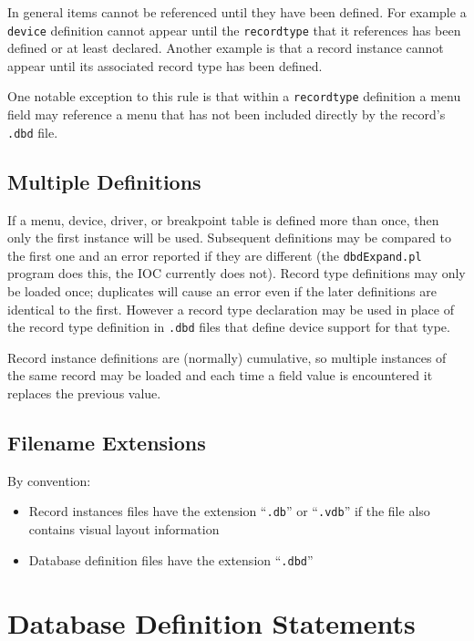 In general items cannot be referenced until they have been defined.
For example a \verb|device| definition cannot appear until the \verb|recordtype| that it references has been defined or at least declared.
Another example is that a record instance cannot appear until its associated record type has been defined.

One notable exception to this rule is that within a \verb|recordtype| definition a menu field may reference a menu that has not been included directly by the record's \verb|.dbd| file.

\subsection{Multiple Definitions}

If a menu, device, driver, or breakpoint table is defined more than once, then only the first instance will be used.
Subsequent definitions may be compared to the first one and an error reported if they are different (the \verb|dbdExpand.pl| program does this, the IOC currently does not).
Record type definitions may only be loaded once; duplicates will cause an error even if the later definitions are identical to the first.
However a record type declaration may be used in place of the record type definition in \verb|.dbd| files that define device support for that type.

Record instance definitions are (normally) cumulative, so multiple instances of the same record may be loaded and each time a field value is encountered it replaces the previous value.

\subsection{Filename Extensions}

By convention:

\begin{itemize}
\item Record instances files have the extension ``\verb|.db|'' or ``\verb|.vdb|'' if the file also contains visual layout information

\item Database definition files have the extension ``\verb|.dbd|''

\end{itemize}

\section{Database Definition Statements}

